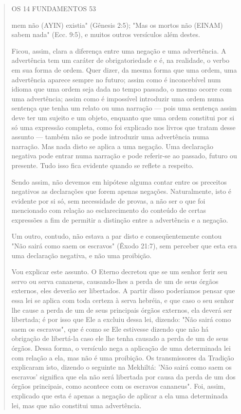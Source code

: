 \begin{quote}
OS 14 FUNDAMENTOS 53

mem não (AYIN) existia" (Gênesis 2:5); "Mas os mortos não (EINAM) sabem
nada" (Ecc. 9:5), e muitos outros versículos além destes.

Ficou, assim, clara a diferença entre uma negação e uma advertên­cia. A
advertência tem um caráter de obrigatoriedade e é, na realidade, o verbo
em sua forma de ordem. Quer dizer, da mesma forma que uma ordem, uma
advertência aparece sempre no futuro; assim como é inconcebível num
idioma que uma ordem seja dada no tempo passado, o mesmo ocorre com uma
adver­tência; assim como é impossível introduzir uma ordem numa sentença
que te­nha um relato ou uma narração --- pois uma sentença assim deve
ter um sujeito e um objeto, enquanto que uma ordem constitui por si só
uma expressão com­pleta, como foi explicado nos livros que tratam desse
assunto --- também não se pode introduzir uma advertência numa narração.
Mas nada disto se aplica a uma negação. Uma declaração negativa pode
entrar numa narração e pode referir-se ao passado, futuro ou presente.
Tudo isso fica evidente quando se reflete a respeito.

Sendo assim, não devemos em hipótese alguma contar entre os pre­ceitos
negativos as declarações que forem apenas negações. Naturalmente, isto é
evidente por si só, sem necessidade de provas, a não ser o que foi
menciona­do com relação ao esclarecimento do conteúdo de certas
expressões a fim de permitir a distinção entre a advertência e a
negação.

Um outro, contudo, não estava a par disto e conseqüentemente con­tou
"Não sairá como saem os escravos" (Êxodo 21:7), sem perceber que esta
era uma declaração negativa, e não uma proibição.

Vou explicar este assunto. O Eterno decretou que se um senhor fe­rir seu
servo ou serva cananeus, causando-lhes a perda de um de seus órgãos
externos, eles deverão ser libertados. A partir disso poderíamos pensar
que es­sa lei se aplica com toda certeza à serva hebréia, e que caso o
seu senhor lhe cause a perda de um de seus principais órgãos externos,
ela deverá ser liberta­da; é por isso que Ele a excluiu dessa lei,
dizendo: "Não sairá como saem os escravos", que é como se Ele estivesse
dizendo que não há obrigação de liber­tá-la caso ele lhe tenha causado a
perda de um de seus órgãos. Dessa forma, o versículo nega a aplicação de
uma determinada lei com relação a ela, mas não é uma proibição. Os
transmissores da Tradição explicaram isto, dizendo o se­guinte na
Mekhiltá: 'Não sairá como saem os escravos' significa que ela não será
libertada por causa da perda de um dos órgãos principais, como acontece
com os escravos cananeus". Foi, assim, explicado que esta é apenas a
negação de aplicar a ela uma determinada lei, mas que não constitui uma
advertência.
\end{quote}

